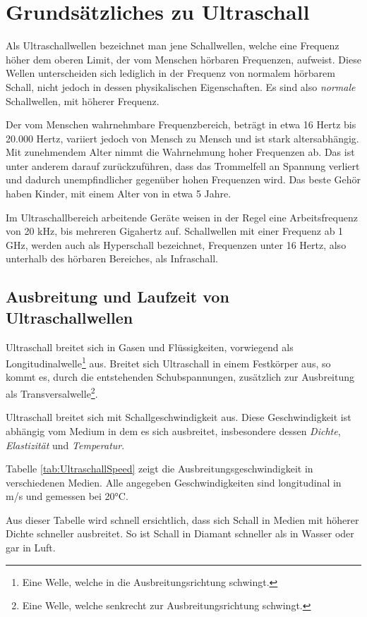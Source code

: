 \chapter{Grundsätzliches zu Ultraschall}
\label{cha:Ultraschall}

Als Ultraschallwellen bezeichnet man jene Schallwellen, welche eine Frequenz höher dem oberen Limit, der vom Menschen hörbaren Frequenzen, aufweist. Diese Wellen unterscheiden sich lediglich in der Frequenz von normalem hörbarem Schall, nicht jedoch in dessen physikalischen Eigenschaften. Es sind also \emph{normale} Schallwellen, mit höherer Frequenz.

Der vom Menschen wahrnehmbare Frequenzbereich, beträgt in etwa 16 Hertz bis 20.000 Hertz, variiert jedoch von Mensch zu Mensch und ist stark altersabhängig. 
Mit zunehmendem Alter nimmt die Wahrnehmung hoher Frequenzen ab. Das ist unter anderem darauf zurückzuführen, dass das Trommelfell an Spannung verliert und dadurch unempfindlicher gegenüber hohen Frequenzen wird. Das beste Gehör haben Kinder, mit einem Alter von in etwa 5 Jahre.
 

Im Ultraschallbereich arbeitende Geräte weisen in der Regel eine Arbeitsfrequenz von 20 kHz, bis mehreren Gigahertz auf. Schallwellen mit einer Frequenz ab 1 GHz, werden auch als Hyperschall bezeichnet, Frequenzen unter 16 Hertz, also unterhalb des hörbaren Bereiches, als Infraschall.

\section{Ausbreitung und Laufzeit von Ultraschallwellen}
Ultraschall breitet sich in Gasen und Flüssigkeiten, vorwiegend als Longitudinalwelle\footnote{Eine Welle, welche in die Ausbreitungsrichtung schwingt.} aus. Breitet sich Ultraschall in einem Festkörper aus, so kommt es, durch die entstehenden Schubspannungen, zusätzlich zur Ausbreitung als Transversalwelle\footnote{Eine Welle, welche senkrecht zur Ausbreitungsrichtung schwingt.}.

Ultraschall breitet sich mit Schallgeschwindigkeit aus. Diese Geschwindigkeit ist abhängig vom Medium in dem es sich ausbreitet, insbesondere dessen \emph{Dichte}, \emph{Elastizität} und \emph{Temperatur}.

Tabelle \ref{tab:UltraschallSpeed} zeigt die Ausbreitungsgeschwindigkeit in verschiedenen Medien. 
Alle angegeben Geschwindigkeiten sind longitudinal in m/s und gemessen bei 20°C.

Aus dieser Tabelle wird schnell ersichtlich, dass sich Schall in Medien mit höherer Dichte schneller ausbreitet. So ist Schall in Diamant schneller als in Wasser oder gar in Luft.

